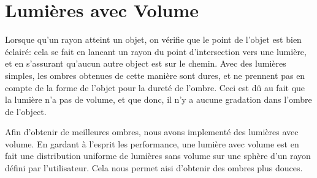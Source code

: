\documentclass{article}
\begin{document}
\section{Lumières avec Volume}

Lorsque qu'un rayon atteint un objet, on vérifie que le point de l'objet est
bien éclairé: cela se fait en lancant un rayon du point d'intersection vers une
lumière, et en s'assurant qu'aucun autre object est sur le chemin. Avec des
lumières simples, les ombres obtenues de cette manière sont dures, et ne
prennent pas en compte de la forme de l'objet pour la dureté de l'ombre.
Ceci est dû au fait que la lumière n'a pas de volume, et que donc, il n'y a
aucune gradation dans l'ombre de l'object.

Afin d'obtenir de meilleures ombres, nous avons implementé des lumières avec
volume. En gardant à l'esprit les performance, une lumière avec volume est en
fait une distribution uniforme de lumières sans volume sur une sphère d'un
rayon défini par l'utilisateur. Cela nous permet aisi d'obtenir des ombres plus
douces.
\end{document}
